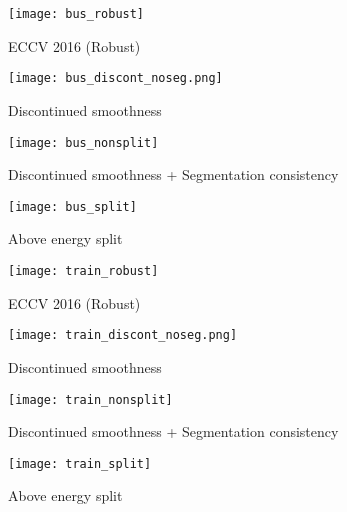 \documentclass[10pt,twocolumn,letterpaper]{article}
\begin{document}
\begin{figure}[htb]
\begin{center}
    \texttt{[image: bus\_robust]}
\end{center}
   \caption{ECCV 2016 (Robust)}
\begin{center}
    \texttt{[image: bus\_discont\_noseg.png]}
\end{center}
   \caption{Discontinued smoothness}
   \begin{center}
    \texttt{[image: bus\_nonsplit]}
\end{center}
   \caption{Discontinued smoothness + Segmentation consistency}
   \begin{center}
    \texttt{[image: bus\_split]}
\end{center}
   \caption{Above energy split}
\end{figure}
\begin{figure}[htb]
\begin{center}
    \texttt{[image: train\_robust]}
\end{center}
   \caption{ECCV 2016 (Robust)}
\begin{center}
    \texttt{[image: train\_discont\_noseg.png]}
\end{center}
   \caption{Discontinued smoothness}
   \begin{center}
    \texttt{[image: train\_nonsplit]}
\end{center}
   \caption{Discontinued smoothness + Segmentation consistency}
   \begin{center}
    \texttt{[image: train\_split]}
\end{center}
   \caption{Above energy split}
\end{figure}




{\small


}
\end{document}
